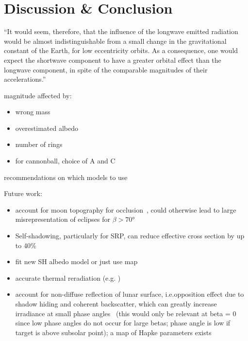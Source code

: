 \section{Discussion \& Conclusion}

\enquote{It would seem, therefore,
that the influence of the longwave emitted radiation would be almost
indistinguishable from a small change in the gravitational constant of the Earth, for
low eccentricity orbits.
As a consequence, one would expect the shortwave
component to have a greater orbital effect than the longwave component, in spite of
the comparable magnitudes of their accelerations.}~\cite{Knocke1989}


magnitude affected by:
\begin{itemize}
    \item wrong mass
    \item overestimated albedo
    \item number of rings
    \item for cannonball, choice of A and C
\end{itemize}

recommendations on which models to use


Future work:
\begin{itemize}
    \item account for moon topography for occlusion~\cite{Mazarico2018}, could otherwise lead to large misrepresentation of eclipses for $\beta > \ang{70}$
    \item Self-shadowing, particularly for SRP, can reduce effective cross section by up to 40\%~\cite{Mazarico2018}
    \item fit new SH albedo model or just use map
    \item accurate thermal reradiation (e.g. \cite{Marshall1994})
    \item account for non-diffuse reflection of lunar surface, i.e.opposition effect due to shadow hiding and coherent backscatter, which can greatly increase irradiance at small phase angles~\cite{Buratti1996} (this would only be relevant at beta = 0 since low phase angles do not occur for large betas; phase angle is low if target is above subsolar point); a map of Hapke parameters exists~\cite{Sato2014}
\end{itemize}


